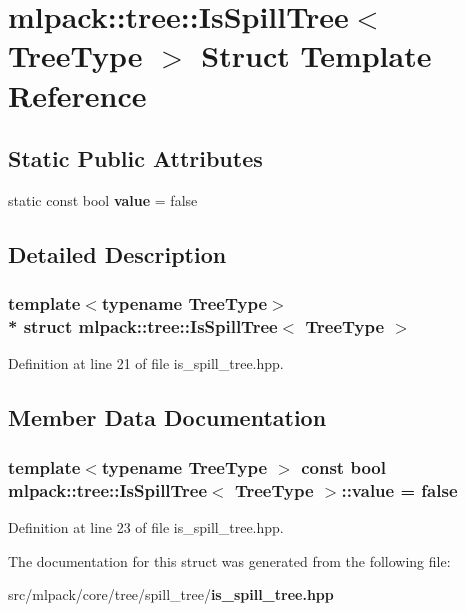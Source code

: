 \section{mlpack\+:\+:tree\+:\+:Is\+Spill\+Tree$<$ Tree\+Type $>$ Struct Template Reference}
\label{structmlpack_1_1tree_1_1IsSpillTree}
\subsection*{Static Public Attributes}
\begin{DoxyCompactItemize}
\item 
static const bool {\bf value} = false
\end{DoxyCompactItemize}


\subsection{Detailed Description}
\subsubsection*{template$<$typename Tree\+Type$>$\\*
struct mlpack\+::tree\+::\+Is\+Spill\+Tree$<$ Tree\+Type $>$}



Definition at line 21 of file is\+\_\+spill\+\_\+tree.\+hpp.



\subsection{Member Data Documentation}
\subsubsection[{value}]{\setlength{\rightskip}{0pt plus 5cm}template$<$typename Tree\+Type $>$ const bool {\bf mlpack\+::tree\+::\+Is\+Spill\+Tree}$<$ Tree\+Type $>$\+::value = false\hspace{0.3cm}{\ttfamily [static]}}\label{structmlpack_1_1tree_1_1IsSpillTree_af32758cce67dc44dca218a49beca399f}


Definition at line 23 of file is\+\_\+spill\+\_\+tree.\+hpp.



The documentation for this struct was generated from the following file\+:\begin{DoxyCompactItemize}
\item 
src/mlpack/core/tree/spill\+\_\+tree/{\bf is\+\_\+spill\+\_\+tree.\+hpp}\end{DoxyCompactItemize}
